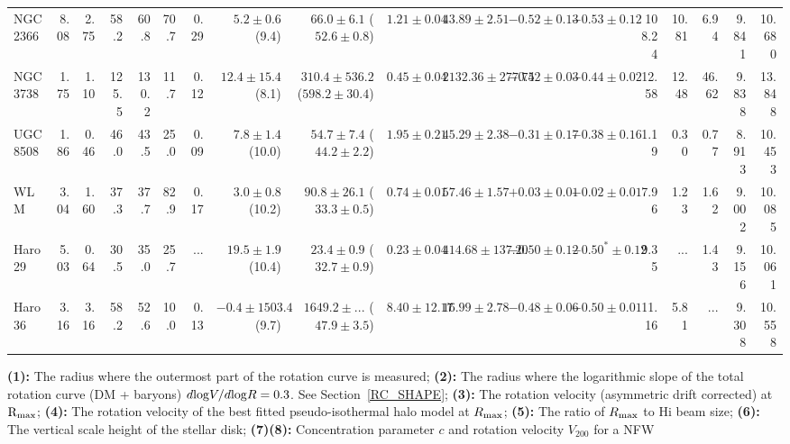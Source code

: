 \documentclass[natbib209]{emulateapj}
\begin{document}
\begin{table}
\begin{center}
{\begin{tabular}{@{}lrrrrrrrrrrrrrrrrr}
NGC 2366		&   8.08	&   2.75 & 58.2 & 60.8	&  70.7 & 0.29  & $5.2 \pm 0.6$ (9.4) & $66.0 \pm 6.1$ ($52.6 \pm 0.8$) & $1.21 \pm 0.04$ & $43.89 \pm 2.51$			&$-0.52 \pm 0.13$		&$-0.53 \pm 0.12$		& 108.24 & 10.81 & 6.94 & 9.841 & 10.680 \\
NGC 3738		&   1.75	&   1.10 & 125.5& 130.2	&  11.7 & 0.12  & $12.4 \pm 15.4$ (8.1) & $310.4 \pm 536.2$ ($598.2 \pm 30.4$) & $0.45 \pm 0.04$ & $2132.36 \pm 277.75$	&$-0.42 \pm 0.03$		&$-0.44 \pm 0.02$		& 12.58 & 12.48 & 46.62 & 9.838 & 13.848 \\
UGC 8508		&   1.86	&   0.46 & 46.0 & 43.5	&  25.0 & 0.09  & $7.8 \pm 1.4$ (10.0) & $54.7 \pm 7.4$ ($44.2 \pm 2.2$) & $1.95 \pm 0.21$ & $45.29 \pm 2.38$ 			&$-0.31 \pm 0.17$		&$-0.38 \pm 0.16$		& 1.19  & 0.30  & 0.77 & 8.913 & 10.453  \\
WLM				&   3.04	&   1.60 & 37.3 & 37.7	&  82.9 & 0.17  & $3.0 \pm 0.8$ (10.2) & $90.8 \pm 26.1$ ($33.3 \pm 0.5$) & $0.74 \pm 0.01$ & $57.46 \pm 1.57$ 			&$+0.03 \pm 0.01$		&$-0.02 \pm 0.01$		& 7.96 & 1.23 & 1.62 & 9.002 & 10.085 \\
Haro 29			&   5.03	&   0.64 & 30.5 & 35.0	&  25.7 & $...$ & $19.5 \pm 1.9$ (10.4) & $23.4 \pm 0.9$ ($32.7 \pm 0.9$) & $0.23 \pm 0.04$ & $414.68 \pm 137.20$ 		&$-0.50 \pm 0.12$		&$-0.50^{*} \pm 0.12$	& 9.35  & $...$ & 1.43 & 9.156 & 10.061 \\
Haro 36			&   3.16	&   3.16 & 58.2 & 52.6	&  10.0 & 0.13  & $-0.4 \pm 1503.4$ (9.7) & $1649.2 \pm ...$ ($47.9 \pm 3.5$) & $8.40 \pm 12.17$ & $16.99 \pm 2.78$ 	&$-0.48 \pm 0.06$		&$-0.50 \pm 0.01$		& 11.16 & 5.81 & $...$ & 9.308 & 10.558 \\
\hline                                                                           
\end{tabular}}
\begin{minipage}{225mm}
\scriptsize{
{\bf (1):} The radius where the outermost part of the rotation curve is measured;
{\bf (2):} The radius where the logarithmic slope of the total rotation curve (DM + baryons) $d{\rm log}V/d{\rm log}R=0.3$. See Section~\ref{RC_SHAPE};
{\bf (3):} The rotation velocity (asymmetric drift corrected) at $\rm R_{\rm max}$;
{\bf (4):} The rotation velocity of the best fitted pseudo-isothermal halo model at $R_{\rm max}$;
{\bf (5):} The ratio of $R_{\rm max}$ to H{\sc i} beam size;
{\bf (6):} The vertical scale height of the stellar disk;
{\bf (7)(8):} Concentration parameter $c$ and rotation velocity $V_{200}$ for a  NFW
}
\end{minipage}
\end{center}
\end{table}
\end{document}
